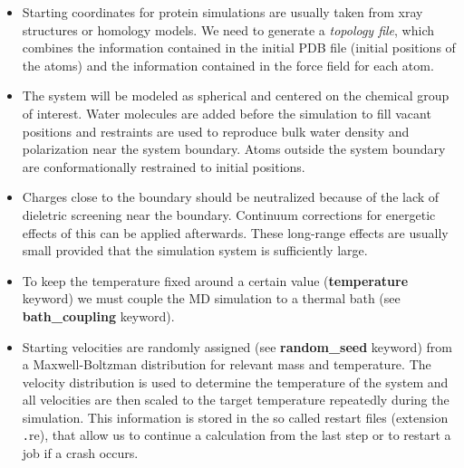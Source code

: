 \documentclass[a4paper,12pt]{article}
\begin{document}
\begin {itemize}
\item Starting coordinates for protein simulations are usually taken from xray structures or homology models. We need to generate a {\it topology file}, which combines the information contained in the initial PDB file (initial positions of the atoms) and the information contained in the force field for each atom.

\item The system will be modeled as spherical and centered on the chemical group of interest. Water molecules are added before the simulation to fill vacant positions and restraints are used to reproduce bulk water density and polarization near the system boundary. Atoms outside the system boundary are conformationally restrained to initial positions.
\item Charges close to the boundary should be neutralized because of the lack of dieletric screening near the boundary. Continuum corrections for energetic effects of this can be applied afterwards. These long-range effects are usually small provided that the simulation system is sufficiently large.
\item To keep the temperature fixed around a certain value ({\bf temperature} keyword) we must couple the MD simulation to a thermal bath (see {\bf bath\_coupling} keyword).
\item Starting velocities are randomly assigned (see {\bf random\_seed} keyword) from a Maxwell-Boltzman distribution for relevant mass and temperature. The velocity distribution is used to determine the temperature of the system and all velocities are then scaled to the target temperature repeatedly during the simulation. This information is stored in the so called restart files (extension {\texttt .re}), that allow us to continue a calculation from the last step or to restart a job if a crash occurs.


\end{itemize}
\end{document}

